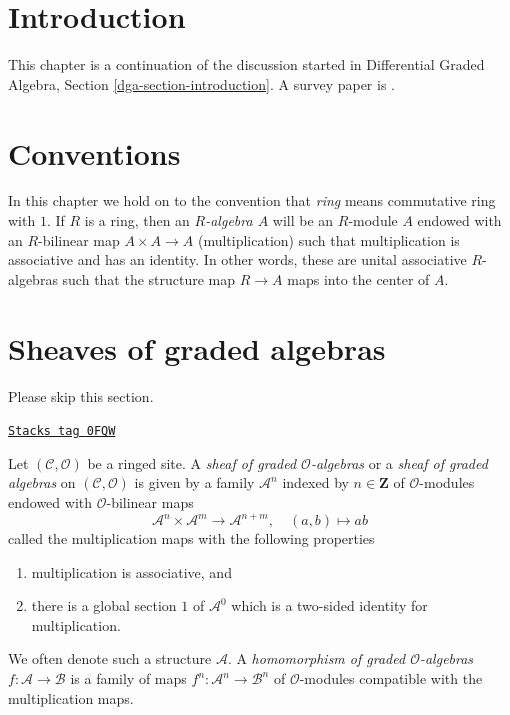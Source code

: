 \section{Introduction}
\label{sdga-section-introduction}
This chapter is a continuation of the discussion started in
Differential Graded Algebra, Section \ref{dga-section-introduction}.
A survey paper is \cite{Keller-survey}.

\section{Conventions}
\label{sdga-section-conventions}
In this chapter we hold on to the convention that {\it ring} means
commutative ring with $1$. If $R$ is a ring, then an {\it $R$-algebra $A$}
will be an $R$-module $A$ endowed with an $R$-bilinear map $A \times A \to A$
(multiplication) such that multiplication is associative and has an
identity.
In other words, these are unital associative $R$-algebras
such that the structure map $R \to A$ maps into the center of $A$.

\section{Sheaves of graded algebras}
\label{sdga-section-ga}
Please skip this section.

\begin{definition}[Ga]
\label{sdga-definition-ga}
\href{https://stacks.math.columbia.edu/tag/0FQW}{\texttt{Stacks tag 0FQW}}

Let $(\mathcal{C}, \mathcal{O})$ be a ringed site. A
{\it sheaf of graded $\mathcal{O}$-algebras}
or a {\it sheaf of graded algebras} on $(\mathcal{C}, \mathcal{O})$
is given by a family $\mathcal{A}^n$ indexed by $n \in \mathbf{Z}$
of $\mathcal{O}$-modules endowed with $\mathcal{O}$-bilinear maps
$$
\mathcal{A}^n \times \mathcal{A}^m \to \mathcal{A}^{n + m},\quad
(a, b) \longmapsto ab
$$
called the multiplication maps with the following properties
\begin{enumerate}
\item multiplication is associative, and
\item there is a global section $1$ of $\mathcal{A}^0$
which is a two-sided identity for multiplication.
\end{enumerate}
We often denote such a structure $\mathcal{A}$.
A {\it homomorphism of graded $\mathcal{O}$-algebras}
$f : \mathcal{A} \to \mathcal{B}$ is a family of maps
$f^n : \mathcal{A}^n \to \mathcal{B}^n$
of $\mathcal{O}$-modules compatible with the multiplication maps.
\end{definition}

